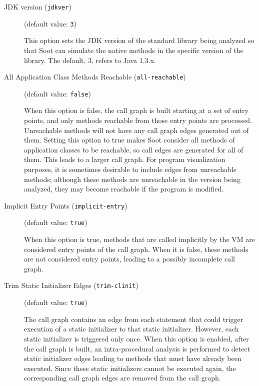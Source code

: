 \documentclass{article}
\begin{document}
\begin{description}
\item[JDK version ({\tt jdkver})]
(default value: {\tt 3})



This option sets the JDK version of the standard library being analyzed so that Soot can simulate the native methods in the specific version of the library. The default, 3, refers to Java 1.3.x.


\item[All Application Class Methods Reachable ({\tt all-reachable})]
(default value: {\tt false})



When this option is false, the call graph is built starting at a set of entry points, and only methods reachable from those entry points are processed. Unreachable methods will not have any call graph edges generated out of them. Setting this option to true makes Soot consider all methods of application classes to be reachable, so call edges are generated for all of them. This leads to a larger call graph. For program visualization purposes, it is sometimes desirable to include edges from unreachable methods; although these methods are unreachable in the version being analyzed, they may become reachable if the program is modified.


\item[Implicit Entry Points ({\tt implicit-entry})]
(default value: {\tt true})



When this option is true, methods that are called implicitly by the VM are considered entry points of the call graph. When it is false, these methods are not considered entry points, leading to a possibly incomplete call graph.


\item[Trim Static Initializer Edges ({\tt trim-clinit})]
(default value: {\tt true})



The call graph contains an edge
from each statement that could trigger execution of a static initializer to that
static initializer. However, each static initializer is triggered only once.
When this option is enabled, after the call graph is built, an intra-procedural
analysis is performed to detect static initializer edges leading to methods
that must have already been executed. Since these static initializers cannot be
executed again, the corresponding call graph edges are removed from the call graph.



\end{description}
\end{document}
